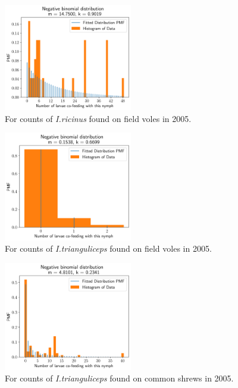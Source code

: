 \documentclass[hidelinks]{article}
\begin{document}
\begin{figure}[]
	\begin{mdframed}[backgroundcolor=grey250,rightline=false,leftline=false,topline=false]
	\includegraphics[width=0.5\textwidth, center]{coaggregation_dist_2005_I.ricinus_FV.png}
	\caption{For counts of \textit{I.ricinus} found on field voles in 2005.}
	\label{fig:distFit_2005_Iricinus_FV}
	\end{mdframed}
\end{figure}

\begin{figure}[]
	\begin{mdframed}[backgroundcolor=grey250,rightline=false,leftline=false,topline=false]
	\includegraphics[width=0.5\textwidth, center]{coaggregation_dist_2005_I.trianguliceps_FV.png}
	\caption{For counts of \textit{I.trianguliceps} found on field voles in 2005.}
	\label{fig:distFit_2005_Itrianguliceps_FV}
	\end{mdframed}
\end{figure}

\begin{figure}[]
	\begin{mdframed}[backgroundcolor=grey250,rightline=false,leftline=false,topline=false]
	\includegraphics[width=0.5\textwidth, center]{coaggregation_dist_2005_I.trianguliceps_SA.png}
	\caption{For counts of \textit{I.trianguliceps} found on common shrews in 2005.}
	\label{fig:distFit_2005_Itrianguliceps_SA}
	\end{mdframed}
\end{figure}
\end{document}
